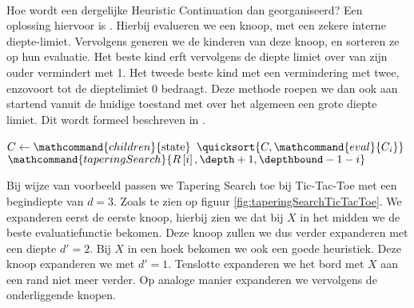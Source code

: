 \paragraph{}
Hoe wordt een dergelijke Heuristic Continuation dan georganiseerd? Een oplossing hiervoor is . Hierbij evalueren we een knoop, met een zekere interne diepte-limiet. Vervolgens generen we de kinderen van deze knoop, en sorteren ze op hun evaluatie. Het beste kind erft vervolgens de diepte limiet over van zijn ouder vermindert met 1. Het tweede beste kind met een vermindering met twee, enzovoort tot de dieptelimiet 0 bedraagt. Deze methode roepen we dan ook aan startend vanuit de huidige toestand met over het algemeen een grote diepte limiet. Dit wordt formeel beschreven in .
\begin{algorithm}[htb]
\caption{$\mathcommand{taperingSearch}{\mbox{state},\depth,\depthbound}$}
\label{alg:taperingSearch}
\begin{algorithmic}[1]
\IF{$\depth<\depthbound$}
\STATE{}
\STATE $C\leftarrow\mathcommand{children}{\mbox{state}}$
\STATE $\quicksort{C,\mathcommand{eval}{C_i}}$
\STATE $\mathcommand{taperingSearch}{R\left[i\right],\depth+1,\depthbound-1-i}$
\ENDFOR
\ENDIF
\end{algorithmic}
\end{algorithm}
\begin{leftbar}
Bij wijze van voorbeeld passen we Tapering Search toe bij Tic-Tac-Toe met een begindiepte van $d=3$. Zoals te zien op figuur \ref{fig:taperingSearchTicTacToe}. We expanderen eerst de eerste knoop, hierbij zien we dat bij $X$ in het midden we de beste evaluatiefunctie bekomen. Deze knoop zullen we dus verder expanderen met een diepte $d'=2$. Bij $X$ in een hoek bekomen we ook een goede heuristiek. Deze knoop expanderen we met $d'=1$. Tenslotte expanderen we het bord met $X$ aan een rand niet meer verder. Op analoge manier expanderen we vervolgens de onderliggende knopen.
\end{leftbar}
